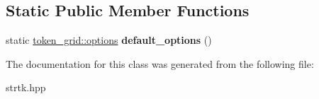 \subsection*{Static Public Member Functions}
\begin{DoxyCompactItemize}
\item 
\hypertarget{classstrtk_1_1token__grid_aaf15a7ebe7a3df44076c40e302a88308}{static \hyperlink{structstrtk_1_1token__grid_1_1options}{token\-\_\-grid\-::options} {\bfseries default\-\_\-options} ()}\label{classstrtk_1_1token__grid_aaf15a7ebe7a3df44076c40e302a88308}

\end{DoxyCompactItemize}


The documentation for this class was generated from the following file\-:\begin{DoxyCompactItemize}
\item 
strtk.\-hpp\end{DoxyCompactItemize}

